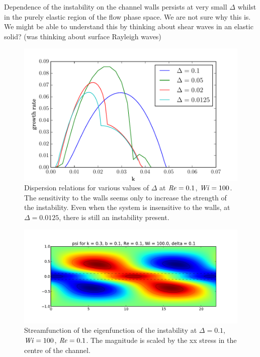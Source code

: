 \documentclass{jfm}
\newcommand\Wi{\mbox{\textit{Wi}}}
\newcommand\Rey{\mbox{\textit{Re}}}  %
\begin{document}
Dependence of the instability on the channel walls persists at very small
$\Delta$ whilst in the purely elastic region of the flow phase space. We are
not sure why this is. We might be able to understand this by thinking about shear
waves in an elastic solid? (was thinking about surface Rayleigh waves)

\begin{figure} 
    \centering 
    \includegraphics[width=\textwidth]{KH_vary_delta}
    \caption{
	Dispersion relations for various values of $\Delta$ at $\Rey = 0.1$,
	$\Wi = 100$. The sensitivity to the walls seems only to increase the
	strength of the instability. Even when the system is insensitive to the
	walls, at $\Delta= 0.0125$, there is still an instability present.
    } 
    \label{fig:walls_dependence} 
\end{figure}

\begin{figure} 
    \centering 
    \includegraphics[width=\textwidth]{psi_high_delta}
    \caption{ 
	Streamfunction of the eigenfunction of the instability at $\Delta =
	0.1$, $\Wi = 100$, $\Rey=0.1$. The magnitude is scaled by the xx stress
	in the centre of the channel.  
    } 
    \label{fig:psi_high_delta}
\end{figure}
\end{document}
